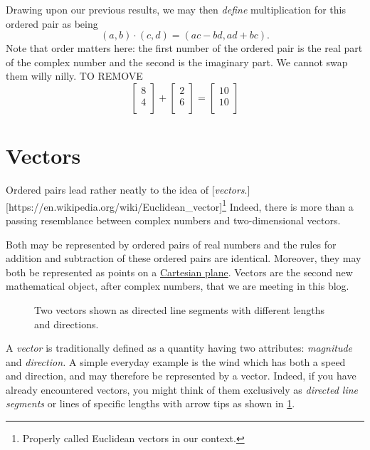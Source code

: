 \documentclass[
  a4paper,
]{article}
\begin{document}
Drawing upon our previous results, we may then \emph{define}
multiplication for this ordered pair as being \[
(a, b)\cdot(c, d) = (ac - bd, ad + bc).
\] Note that order matters here: the first number of the ordered pair is
the real part of the complex number and the second is the imaginary
part. We cannot swap them willy nilly. TO REMOVE \[
  \begin{bmatrix}
  8\\
  4\\
  \end{bmatrix}
  +
  \begin{bmatrix}
  2\\
  6\\
  \end{bmatrix}
  =
  \begin{bmatrix}
  10\\
  10\\
  \end{bmatrix}
\]

\hypertarget{vectors}{%
\section{Vectors}\label{vectors}}

Ordered pairs lead rather neatly to the idea of
{[}\emph{vectors}.{]}{[}https://en.wikipedia.org/wiki/Euclidean\_vector{]}\footnote{Properly
  called Euclidean vectors in our context.} Indeed, there is more than a
passing resemblance between complex numbers and two-dimensional vectors.

Both may be represented by ordered pairs of real numbers and the rules
for addition and subtraction of these ordered pairs are identical.
Moreover, they may both be represented as points on a
\href{https://en.wikipedia.org/wiki/Cartesian_coordinate_system}{Cartesian
plane}. Vectors are the second new mathematical object, after complex
numbers, that we are meeting in this blog.

\begin{figure}
\hypertarget{fig:two-vectors}{%
\centering

\caption{Two vectors shown as directed line segments with different
lengths and directions.}\label{fig:two-vectors}
}
\end{figure}

A \emph{vector} is traditionally defined as a quantity having two
attributes: \emph{magnitude} and \emph{direction.} A simple everyday
example is the wind which has both a speed and direction, and may
therefore be represented by a vector. Indeed, if you have already
encountered vectors, you might think of them exclusively as
\emph{directed line segments} or lines of specific lengths with arrow
tips as shown in \cref{fig:two-vectors}.
\end{document}

